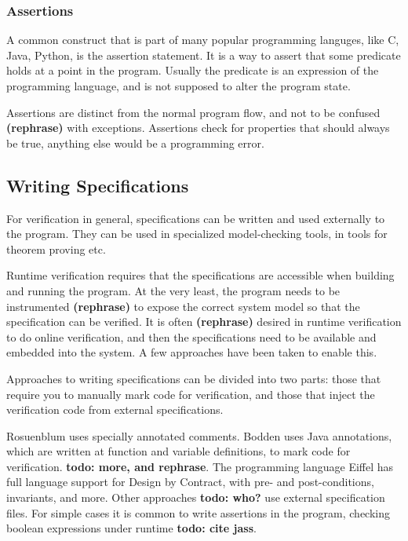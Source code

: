 \documentclass[a4paper,11pt]{kth-mag}
\newcommand{\todo}[1]{\textbf{todo: #1}}
\newcommand{\rephrase}{\textbf{(rephrase)} }
\begin{document}
\subsubsection{Assertions}

A common construct that is part of many popular programming languges, like C,
Java, Python, is the assertion statement. It is a way to assert that some
predicate holds at a point in the program. Usually the predicate is an
expression of the programming language, and is not supposed to alter the
program state.

Assertions are distinct from the normal program flow, and not to be confused
\rephrase with exceptions. Assertions check for properties that should always
be true, anything else would be a programming error.


\subsection{Writing Specifications}

For verification in general, specifications can be written and used externally
to the program. They can be used in specialized model-checking tools, in tools
for theorem proving etc.

Runtime verification requires that the specifications are accessible when
building and running the program. At the very least, the program needs to be
instrumented \rephrase to expose the correct system model so that the
specification can be verified. It is often \rephrase desired in runtime
verification to do online verification, and then the specifications need to be
available and embedded into the system. A few approaches have been taken to
enable this.

Approaches to writing specifications can be divided into two parts: those that
require you to manually mark code for verification, and those that inject the
verification code from external specifications.

Rosuenblum \cite{rosenblum95practicalassertions} uses specially annotated
comments. Bodden \cite{bodden05efficientrv} uses Java annotations, which are
written at function and variable definitions, to mark code for verification.
\todo{more, and rephrase}. The programming language Eiffel has full language
support for Design by Contract, with pre- and post-conditions, invariants, and
more. Other approaches \todo{who?} use external specification files. For simple
cases it is common to write assertions in the program, checking boolean
expressions under runtime \todo{cite jass}.
\end{document}
